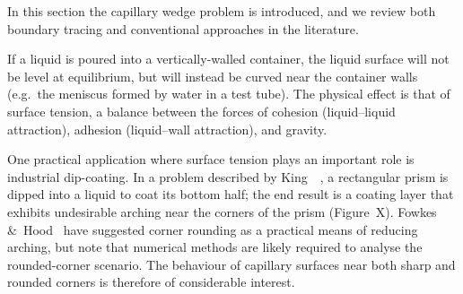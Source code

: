 In this section the capillary wedge problem is introduced,
and we review both boundary tracing and conventional approaches
in the literature.

If a liquid is poured into a vertically-walled container,
the liquid surface will not be level at equilibrium,
but will instead be curved near the container walls
(e.g.~the meniscus formed by water in a test tube).
The physical effect is that of surface tension,
a balance between the forces of cohesion (liquid--liquid attraction),
adhesion (liquid--wall attraction), and gravity.

One practical application
where surface tension plays an important role
is industrial dip-coating.
In a problem described by
King~\etal~\cite{king-1999-laplace-young-near-corner},
a rectangular prism is dipped into a liquid to coat its bottom half;
the end result is a coating layer
that exhibits undesirable arching near the corners of the prism
(Figure~X). %
Fowkes \&~Hood~\cite{fowkes-1998-surface-tension-effects-wedge}
have suggested corner rounding as a practical means of reducing arching,
but note that numerical methods are likely required
to analyse the rounded-corner scenario.
The behaviour of capillary surfaces near both sharp and rounded corners
is therefore of considerable interest.

